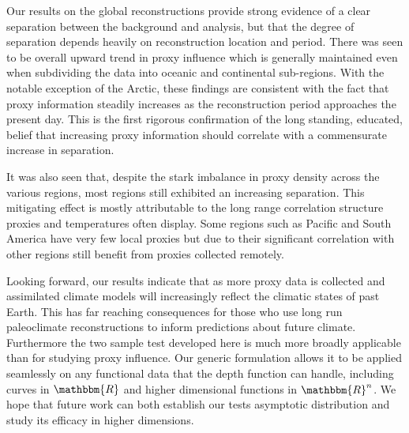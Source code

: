 \documentclass[12pt]{article}
\begin{document}
Our results on the global reconstructions provide strong evidence of a clear separation between the background and analysis, but that the degree of separation depends heavily on reconstruction location and period. There was seen to be overall upward trend in proxy influence which is generally maintained even when subdividing the data into oceanic and continental sub-regions. With the notable exception of the Arctic, these findings are consistent with the fact that proxy information steadily increases as the reconstruction period approaches the present day. This is the first rigorous confirmation of the long standing, educated, belief that increasing proxy information should correlate with a commensurate increase in separation.

It was also seen that, despite the stark imbalance in proxy density across the various regions, most regions still exhibited an increasing separation. This mitigating effect is mostly attributable to the long range correlation structure proxies and temperatures often display. Some regions such as Pacific and South America have very few local proxies but due to their significant correlation with other regions still benefit from proxies collected remotely.

Looking forward, our results indicate that as more proxy data is collected and assimilated climate models will increasingly reflect the climatic states of past Earth. This has far reaching consequences for those who use long run paleoclimate reconstructions to inform predictions about future climate. Furthermore the two sample test developed here is much more broadly applicable than for studying proxy influence. Our generic formulation allows it to be applied seamlessly on any functional data that the depth function can handle, including curves in $\mathbbm{R}$ and higher dimensional functions in $\mathbbm{R}^n$. We hope that future work can both establish our tests asymptotic distribution and study its efficacy in higher dimensions.
\end{document}
